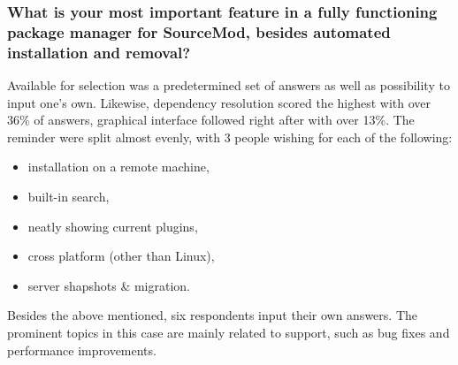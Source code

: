 \subsubsection{What is your most important feature in a fully functioning package manager for SourceMod, besides automated installation and removal?}

Available for selection was a predetermined set of answers as well as possibility to input one's own.
Likewise, dependency resolution scored the highest with over 36\% of answers, graphical interface followed right after with over 13\%.
The reminder were split almost evenly, with 3 people wishing for each of the following:

\begin{itemize}
    \item installation on a remote machine,
    \item built-in search,
    \item neatly showing current plugins,
    \item cross platform (other than Linux),
    \item server shapshots \& migration.
\end{itemize}

Besides the above mentioned, six respondents input their own answers.
The prominent topics in this case are mainly related to support, such as bug fixes and performance improvements.
%
%
%
